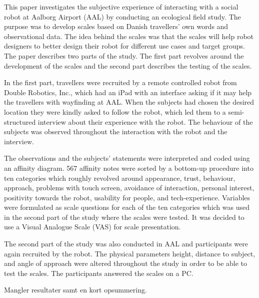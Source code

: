 \label{Abstract}
This paper investigates the subjective experience of interacting with a social robot at Aalborg Airport (AAL) by conducting an ecological field study.  The purpose was to develop scales based on Danish travellers' own words and observational data. The idea behind the scales was that the scales will help robot designers to better design their robot for different use cases and target groups. The paper describes two parts of the study. The first part revolves around the development of the scales and the second part describes the testing of the scales.

In the first part, travellers were recruited by a remote controlled robot from Double Robotics, Inc., which had an iPad with an interface asking if it may help the travellers with wayfinding at AAL. When the subjects had chosen the desired location they were kindly asked to follow the robot, which led them to a semi-structured interview about their experience with the robot. The behaviour of the subjects was observed throughout the interaction with the robot and the interview. 

The observations and the subjects' statements were interpreted and coded using an affinity diagram. 567 affinity notes were sorted by a bottom-up procedure into ten categories which roughly revolved around appearance, trust, behaviour, approach, problems with touch screen, avoidance of interaction, personal interest, positivity towards the robot, usability for people, and tech-experience.  Variables were formulated as scale questions for each of the ten categories which was used in the second part of the study where the scales were tested. It was decided to use a Visual Analogue Scale (VAS) for scale presentation.

The second part of the study was also conducted in AAL and participants were again recruited by the robot. The physical parameters height, distance to subject, and angle of approach were altered throughout the study in order to be able to test the scales. The participants answered the scales on a PC. 

{\color{red} Mangler resultater samt en kort opsummering.}


